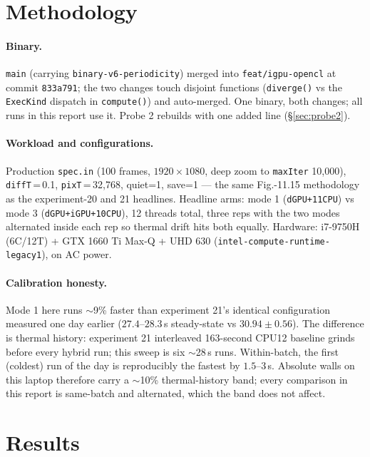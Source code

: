 \documentclass[
	english,
	letterpaper, oneside
]{article}
\begin{document}
\section{Methodology}

\paragraph{Binary.} \texttt{main} (carrying \texttt{binary-v6-periodicity})
merged into \texttt{feat/igpu-opencl} at commit \texttt{833a791}; the two
changes touch disjoint functions (\texttt{diverge()} vs the
\texttt{ExecKind} dispatch in \texttt{compute()}) and auto-merged. One
binary, both changes; all runs in this report use it. Probe 2 rebuilds with
one added line (\S\ref{sec:probe2}).

\paragraph{Workload and configurations.} Production \texttt{spec.in}
(100 frames, $1920\times1080$, deep zoom to \texttt{maxIter} 10{,}000),
\texttt{diffT}\,=\,0.1, \texttt{pixT}\,=\,32{,}768, quiet=1, save=1 --- the
same Fig.-11.15 methodology as the experiment-20 and 21 headlines. Headline
arms: mode 1 (\texttt{dGPU+11CPU}) vs mode 3 (\texttt{dGPU+iGPU+10CPU}), 12
threads total, three reps with the two modes alternated inside each rep so
thermal drift hits both equally. Hardware: i7-9750H (6C/12T) + GTX 1660 Ti
Max-Q + UHD 630 (\texttt{intel-compute-runtime-legacy1}), on AC power.

\paragraph{Calibration honesty.} Mode 1 here runs $\sim$9\% faster than
experiment 21's identical configuration measured one day earlier
($27.4$--$28.3$\,s steady-state vs $30.94\pm0.56$). The difference is thermal
history: experiment 21 interleaved 163-second CPU12 baseline grinds before
every hybrid run; this sweep is six $\sim$28\,s runs. Within-batch, the first
(coldest) run of the day is reproducibly the fastest by $1.5$--$3$\,s.
Absolute walls on this laptop therefore carry a $\sim$10\% thermal-history
band; every comparison in this report is same-batch and alternated, which the
band does not affect.

\section{Results}
\end{document}
